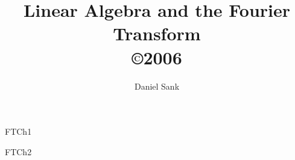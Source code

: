 \documentclass{report}
\author{Daniel Sank}
\title{Linear Algebra and the Fourier Transform \\
\copyright 2006}
\begin{document}
\maketitle

\tableofcontents

{FTCh1}

{FTCh2}
\end{document}
